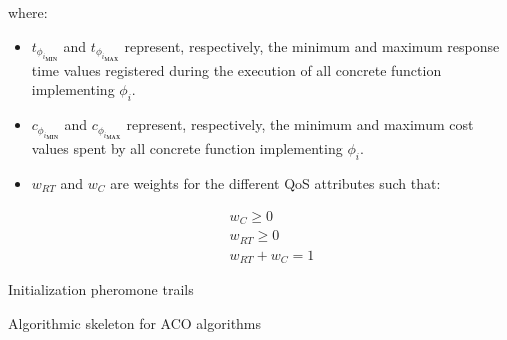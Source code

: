 \documentclass[12pt,a4paper]{report}
\theoremstyle{definition}
\begin{document}
where:

\begin{itemize}
	\item $t_{\phi_{i_{\textbf{MIN}}}}$ and $t_{\phi_{i_{\textbf{MAX}}}}$ represent, respectively, the minimum and maximum response time values registered during the execution of all concrete function implementing $\phi_i$.
	
	\item $c_{\phi_{i_{\textbf{MIN}}}}$ and $c_{\phi_{i_{\textbf{MAX}}}}$ represent, respectively, the minimum and maximum cost values spent by all concrete function implementing $\phi_i$.
	
	\item $w_{RT}$ and $w_{C}$ are weights for the different QoS attributes such that:
	
	\begin{eqnarray}
		w_{C} \geq 0 \\
		w_{RT} \geq 0 \\
		w_{RT} + w_{C} = 1
	\end{eqnarray}
	
\end{itemize}




\begin{algorithm}
	Initialization pheromone trails\;
	\caption{Algorithmic skeleton for ACO algorithms}
\end{algorithm}


\begin{algorithm}
\end{algorithm}
\end{document}
